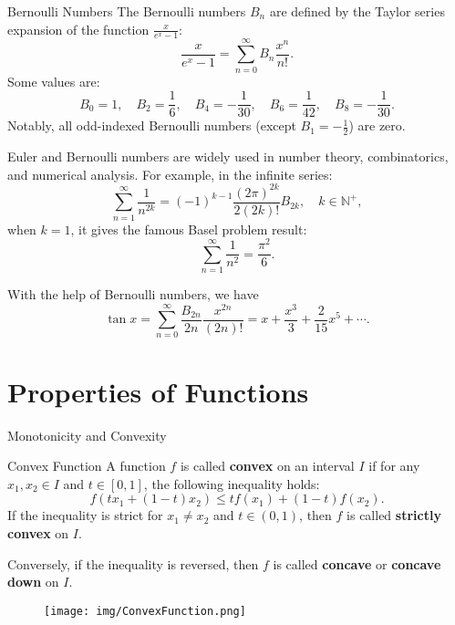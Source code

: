 \documentclass[11pt]{../../TexTemplate/elegantbook}
\begin{document}
\begin{definition}{Bernoulli Numbers}
    The Bernoulli numbers \(B_n\) are defined by the Taylor series expansion of the function \(\frac{x}{e^x - 1}\):
    \[
        \frac{x}{e^x - 1} = \sum_{n=0}^{\infty} B_n \frac{x^n}{n!}.
    \]
    Some values are:
    \[
        B_0 = 1, \quad B_2 = \frac{1}{6}, \quad B_4 = -\frac{1}{30}, \quad B_6 = \frac{1}{42}, \quad B_8 = -\frac{1}{30}.
    \]
    Notably, all odd-indexed Bernoulli numbers (except \(B_1 = -\frac{1}{2}\)) are zero.
\end{definition}

\begin{remark}
    Euler and Bernoulli numbers are widely used in number theory, combinatorics, and numerical analysis.
    For example, in the infinite series:
    \[
    \sum_{n=1}^{\infty}  \frac{1}{n^{2k}} = (-1)^{k-1} \frac{(2\pi)^{2k}}{2(2k)!} B_{2k},\quad k \in \mathbb{N}^{+},
    \]
    when \(k=1\), it gives the famous Basel problem result:
    \[
    \sum_{n=1}^{\infty}  \frac{1}{n^{2}} = \frac{\pi^2}{6}.
    \]
\end{remark}

With the help of Bernoulli numbers, we have
\[
\tan x = \sum_{n=0}^{\infty} \frac{B_{2n}}{2n} \frac{x^{2n}}{(2n)!} = 
x + \frac{x^3}{3} + \frac{2}{15}x^5 + \cdots.
\]


\section{Properties of Functions}
\begin{leftbarTitle}{Monotonicity and Convexity}\end{leftbarTitle}
\begin{definition}{Convex Function}
    A function \(f\) is called \textbf{convex} on an interval \(I\) if for any \(x_1, x_2 \in I\) and 
    \(t \in [0,1]\), the following inequality holds:
    \[
        f(t x_1 + (1-t)x_2) \leqslant t f(x_1) + (1-t)f(x_2).
    \]
    If the inequality is strict for \(x_1 \neq x_2\) and \(t \in (0,1)\), 
    then \(f\) is called \textbf{strictly convex} on \(I\).

    Conversely, if the inequality is reversed, then \(f\) is called \textbf{concave} or \textbf{concave down} on \(I\).
\end{definition}
\begin{figure}[h]
    \centering
    \texttt{[image: img/ConvexFunction.png]}
\end{figure}
\end{document}

